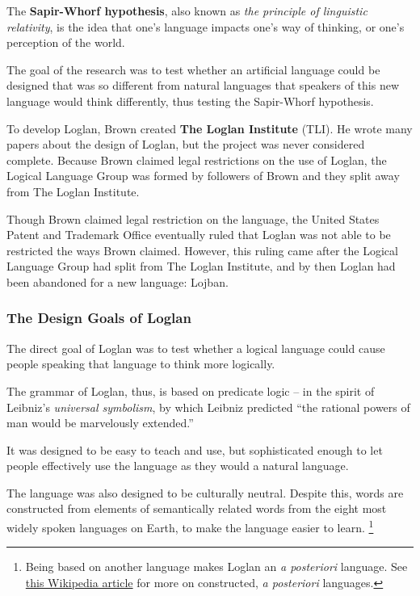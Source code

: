 \documentclass[12pt]{book}
\begin{document}
The \textbf{Sapir-Whorf hypothesis}, also known as \emph{the principle of linguistic relativity}, is the idea that one's language impacts one's way of thinking, or one's perception of the world.

The goal of the research was to test whether an artificial language could be designed that was so different from natural languages that speakers of this new language would think differently, thus testing the Sapir-Whorf hypothesis. 

To develop Loglan, Brown created \textbf{The Loglan Institute} (TLI). He wrote many papers about the design of Loglan, but the project was never considered complete. Because Brown claimed legal restrictions on the use of Loglan, the Logical Language Group was formed by followers of Brown and they split away from The Loglan Institute. 

Though Brown claimed legal restriction on the language, the United States Patent and Trademark Office eventually ruled that Loglan was not able to be restricted the ways Brown claimed. However, this ruling came after the Logical Language Group had split from The Loglan Institute, and by then Loglan had been abandoned for a new language: Lojban. 



\subsubsection{The Design Goals of Loglan}

The direct goal of Loglan was to test whether a logical language could cause people speaking that language to think more logically. 

The grammar of Loglan, thus, is based on predicate logic -- in the spirit of Leibniz's \emph{universal symbolism}, by which Leibniz predicted ``the rational powers of man would be marvelously extended.'' \cite{BrownSci} 

It was designed to be easy to teach and use, but sophisticated enough to let people effectively use the language as they would a natural language.

The language was also designed to be culturally neutral. 
Despite this, words are constructed from elements of semantically related words from the eight most widely spoken languages on Earth, to make the language easier to learn. \footnote{Being based on another language makes Loglan an \textit{a posteriori} language. See \href{https://en.wikipedia.org/wiki/Constructed_language\#a_posteriori_language}{this Wikipedia article} for more on constructed, \textit{a posteriori} languages.}
\end{document}
